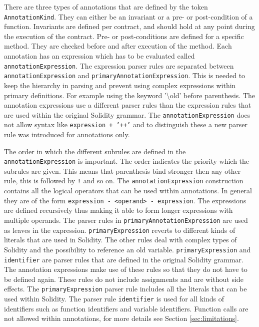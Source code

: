 \documentclass[a4paper]{article}
\begin{document}
There are three types of annotations that are defined by the token \texttt{AnnotationKind}. They can either be an invariant or a pre- or post-condition of a function. Invariants are defined per contract, and should hold at any point during the execution of the contract. Pre- or post-conditions are defined for a specific method. They are checked before and after execution of the method. Each annotation has an expression which has to be evaluated called \texttt{annotationExpression}. The expression parser rules are separated between \texttt{annotationExpression} and \texttt{primaryAnnotationExpression}. This is needed to keep the hierarchy in parsing and prevent using complex expressions within primary definitions. For example using the keyword '\textbackslash old' before parenthesis. The annotation expressions use a different parser rules than the expression rules that are used within the original Solidity grammar. The \texttt{annotationExpression} does not allow syntax like \texttt{expression + '++'} and to distinguish these a new parser rule was introduced for annotations only. \par
The order in which the different subrules are defined in the \texttt{annotationExpression} is important. The order indicates the priority which the subrules are given. This means that parenthesis bind stronger then any other rule, this is followed by \texttt{!} and so on. The \texttt{annotationExpression} construction contains all the logical operators that can be used within annotations. In general they are of the form \texttt{expression - <operand> - expression}. The expressions are defined recursively thus making it able to form longer expressions with multiple operands. The parser rules in \texttt{primaryAnnotationExpression} are used as leaves in the expression. \texttt{primaryExpression} reverts to different kinds of literals that are used in Solidity. The other rules deal with complex types of Solidity and the possibility to reference an old variable.  
\texttt{primaryExpression} and \texttt{identifier} are parser rules that are defined in the original Solidity grammar. The annotation expressions make use of these rules so that they do not have to be defined again. These rules do not include assignments and are without side effects. The \texttt{primaryExpression} parser rule includes all the literals that can be used within Solidity. The parser rule \texttt{identifier} is used for all kinds of identifiers such as function identifiers and variable identifiers. Function calls are not allowed within annotations, for more details see Section \ref{sec:limitations}.
\end{document}
